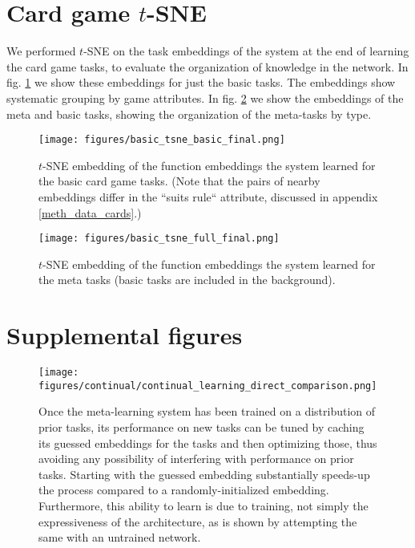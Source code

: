 \documentclass{article}
\begin{document}
\section{Card game $t$-SNE} \label{app_cards_tsne}
We performed $t$-SNE \citep{LaurensvanderMaaten2008} on the task embeddings of the system at the end of learning the card game tasks, to evaluate the organization of knowledge in the network. In fig. \ref{fig_cards_tsne_basic} we show these embeddings for just the basic tasks. The embeddings show systematic grouping by game attributes. In fig. \ref{fig_cards_tsne_full} we show the embeddings of the meta and basic tasks, showing the organization of the meta-tasks by type. \par 
\begin{figure}[H]
\centering
\texttt{[image: figures/basic\_tsne\_basic\_final.png]}
\caption{$t$-SNE embedding of the function embeddings the system learned for the basic card game tasks. (Note that the pairs of nearby embeddings differ in the ``suits rule`` attribute, discussed in appendix \ref{meth_data_cards}.)} 
\label{fig_cards_tsne_basic}
\end{figure}%
\begin{figure}[H]
\centering
\texttt{[image: figures/basic\_tsne\_full\_final.png]}
\caption{$t$-SNE embedding of the function embeddings the system learned for the meta tasks (basic tasks are included in the background).} 
\label{fig_cards_tsne_full}
\end{figure}


\section{Supplemental figures}
\begin{figure}[H]
\centering
\texttt{[image: figures/continual/continual\_learning\_direct\_comparison.png]}
\caption{Once the meta-learning system has been trained on a distribution of prior tasks, its performance on new tasks can be tuned by caching its guessed embeddings for the tasks and then optimizing those, thus avoiding any possibility of interfering with performance on prior tasks. Starting with the guessed embedding substantially speeds-up the process compared to a randomly-initialized embedding. Furthermore, this ability to learn is due to training, not simply the expressiveness of the architecture, as is shown by attempting the same with an untrained network.}
\label{supp_poly_continual_results}
\end{figure}
\end{document}
